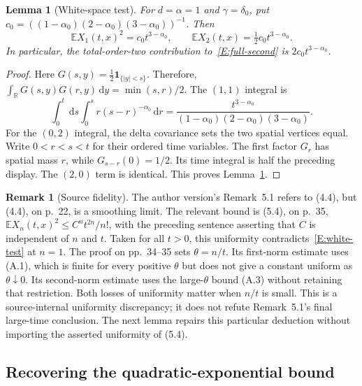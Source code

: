 \documentclass[12pt]{article}
\numberwithin{equation}{section}
\newtheorem{lemma}[theorem]{Lemma}
\theoremstyle{definition}
\newtheorem{remark}[theorem]{Remark}
\newcommand{\R}{\mathbb{R}}
\newcommand{\E}{\mathbb{E}}
\newcommand{\ud}{\,\mathrm{d}}
\begin{document}
\begin{lemma}[White-space test]\label{L:white-test}
  For $d=\alpha=1$ and $\gamma=\delta_0$, put
  $c_0=((1-\alpha_0)(2-\alpha_0)(3-\alpha_0))^{-1}$. Then
  \begin{equation}\label{E:white-test}
    \E X_1(t,x)^2=c_0t^{3-\alpha_0},\qquad
    \E X_2(t,x)=\tfrac12c_0t^{3-\alpha_0}.
  \end{equation}
  In particular, the total-order-two contribution to~\eqref{E:full-second}
  is $2c_0t^{3-\alpha_0}$.
\end{lemma}

\begin{proof}
  Here $G(s,y)=\frac12\mathbf1_{\{|y|<s\}}$. Therefore,
  $\int_\R G(s,y)G(r,y)\ud y=\min(s,r)/2$. The $(1,1)$ integral is
  \[
    \int_0^t\ud s\int_0^s r(s-r)^{-\alpha_0}\ud r
    =\frac{t^{3-\alpha_0}}
    {(1-\alpha_0)(2-\alpha_0)(3-\alpha_0)}.
  \]
  For the $(0,2)$ integral, the delta covariance sets the two spatial
  vertices equal. Write $0<r<s<t$ for their ordered time variables.
  The first factor $G_r$ has spatial mass $r$, while
  $G_{s-r}(0)=1/2$. Its time integral is half the
  preceding display. The $(2,0)$ term is identical. This proves
  Lemma~\ref{L:white-test}.
\end{proof}

\begin{remark}[Source fidelity]\label{R:source-uniformity}
  The author version's Remark~5.1 refers to (4.4), but (4.4), on p.~22,
  is a smoothing limit. The relevant bound is (5.4), on p.~35,
  $\E X_n(t,x)^2\le C^nt^{2n}/n!$, with the preceding sentence asserting
  that $C$ is independent of $n$ and $t$. Taken for all $t>0$, this
  uniformity contradicts~\eqref{E:white-test} at $n=1$.
  The proof on pp.~34--35 sets $\theta=n/t$. Its first-norm estimate
  uses (A.1), which is finite for every positive $\theta$ but does not
  give a constant uniform as $\theta\downarrow0$. Its second-norm
  estimate uses the large-$\theta$ bound (A.3) without retaining that
  restriction. Both losses of uniformity matter when $n/t$ is small.
  This is a source-internal uniformity discrepancy; it does not refute
  Remark~5.1's final large-time conclusion. The next lemma repairs this
  particular deduction without importing the asserted uniformity of (5.4).
\end{remark}

\subsection{Recovering the quadratic-exponential bound}
\end{document}
